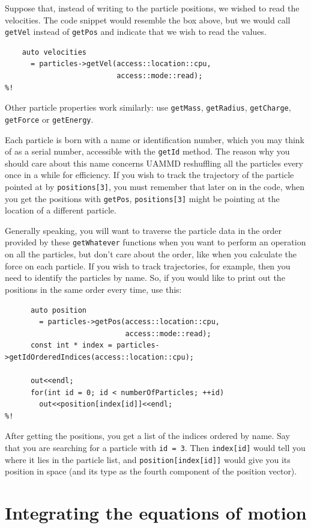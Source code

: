 Suppose that, instead of writing to the particle positions, we wished to read
the velocities. The code snippet would resemble the box above, but we would call
\texttt{getVel} instead of \texttt{getPos} and indicate that we wish to read the
values.
\begin{lstlisting}
    auto velocities
      = particles->getVel(access::location::cpu,
                          access::mode::read);
%!
\end{lstlisting}
Other particle properties work similarly: use \texttt{getMass},
\texttt{getRadius}, \texttt{getCharge}, \texttt{getForce} or \texttt{getEnergy}.

Each particle is born with a name or identification number, which you may think
of as a serial number, accessible with the \texttt{getId} method. The reason why
you should care about this name concerns UAMMD reshuffling all the particles
every once in a while for efficiency. If you wish to track the trajectory of the
particle pointed at by \texttt{positions[3]}, you must remember that later on in
the code, when you get the positions with \texttt{getPos}, \texttt{positions[3]}
might be pointing at the location of a different particle.

Generally speaking, you will want to traverse the particle data in the order
provided by these \texttt{getWhatever} functions when you want to perform an
operation on all the particles, but don't care about the order, like when you
calculate the force on each particle. If you wish to track trajectories, for
example, then you need to identify the particles by name. So, if you would
like to print out the positions in the same order every time, use this:
\label{particlePositions}
\begin{lstlisting}
      auto position
        = particles->getPos(access::location::cpu,
                            access::mode::read);
      const int * index = particles->getIdOrderedIndices(access::location::cpu);

      out<<endl;
      for(int id = 0; id < numberOfParticles; ++id)
        out<<position[index[id]]<<endl;
%!
\end{lstlisting}
After getting the positions, you get a list of the indices ordered by name. Say
that you are searching for a particle with \texttt{id = 3}. Then
\texttt{index[id]} would tell you where it lies in the particle list, and
\texttt{position[index[id]]} would give you its position in space (and its type
as the fourth component of the position vector).

\section{Integrating the equations of motion}

